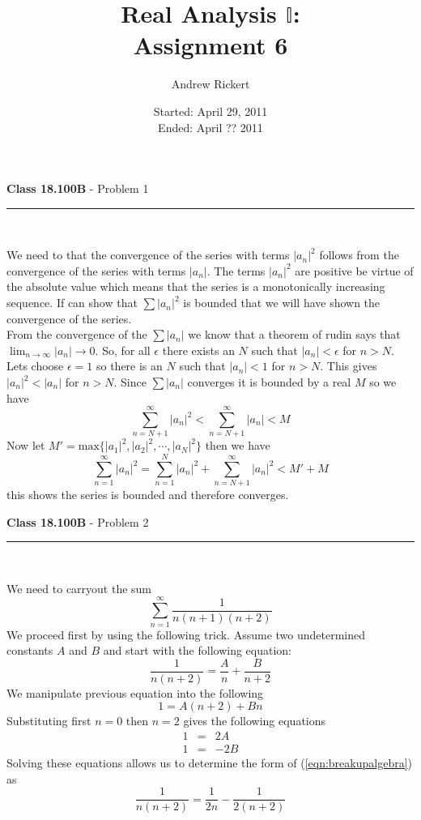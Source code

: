 \documentclass[11pt,reqno]{article}
\title{Real Analysis $\mathbb{I}$: \\ Assignment 6}
\author{Andrew Rickert}
\date{Started: April 29, 2011 \\ \hspace{1pt} Ended: April ??  2011}                                           %
\begin{document}
\maketitle


\begin{flushleft} 
\textbf{Class 18.100B} - Problem 1\\
\rule{500pt}{1pt}\\
\end{flushleft} 

We need to that the convergence of the series with terms $|a_n|^2$ follows from the convergence of the series with terms $|a_n|$. The terms $|a_n|^2$ are positive be virtue of the absolute value which means that the series is a monotonically increasing sequence. If can show that $\sum |a_n|^2$ is bounded that we will have shown the convergence of the series.\\
\indent From the convergence of the $\sum |a_n|$ we know that a theorem of rudin says that $\lim_{n \to \infty} |a_n| \to 0$. So, for all $\epsilon$ there exists an $N$ such that $|a_n| < \epsilon$ for $n > N$.\\
\indent Lets choose $\epsilon = 1$ so there is an $N$ such that $|a_n| < 1$ for $n > N$. This gives $|a_n|^2 < |a_n|$ for $n > N$. Since $\sum |a_n|$ converges it is bounded by a real $M$ so we have 
\[ \sum_{n = N+1}^\infty |a_n|^2 < \sum_{n = N +1}^\infty |a_n| < M \]
Now let $M' = \text{max} \{ |a_1|^2, |a_2|^2, \cdots, |a_N|^2 \}$ then we have 
\[ \sum_{n = 1}^\infty |a_n|^2 = \sum_{n = 1}^N |a_n|^2 + \sum_{n = N+1}^\infty |a_n|^2 < M' + M \]
this shows the series is bounded and therefore converges.

\vspace{15pt}
\begin{flushleft} 
\textbf{Class 18.100B} - Problem 2\\
\rule{500pt}{1pt}\\
\end{flushleft} 

We need to carryout the sum \[ \sum_{n =1}^\infty \frac{1}{n(n+1)(n+2)} \]
We proceed first by using the following trick. Assume two undetermined constants $A$ and $B$ and start with the following equation:
\begin{equation} 
\frac{1}{n(n+2)} = \frac{A}{n} + \frac{B}{n+2} \label{eqn:breakupalgebra}
\end{equation}
We manipulate previous equation into the following
\[ 1 = A(n+2) + B n \]
Substituting first $n = 0$ then $n = 2$ gives the following equations
\begin{eqnarray*}
1 &=& 2 A \\
1 &=& -2 B 
\end{eqnarray*}
Solving these equations allows us to determine the form of (\ref{eqn:breakupalgebra}) as
\begin{equation}
\frac{1}{n(n+2)} = \frac{1}{2n} - \frac{1}{2(n+2)} \label{eqn:firstbreakup}
\end{equation}
\end{document}
